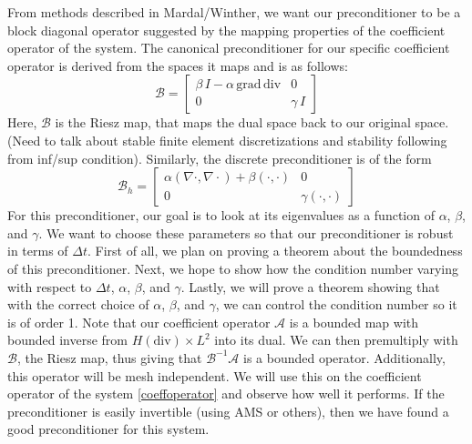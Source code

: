 \documentclass[11pt]{article}
\newcommand{\divv}{\mathrm{div}}
\newcommand{\gradd}{\mathrm{grad}}
\begin{document}

From methods described in Mardal/Winther, we want our preconditioner to be a block diagonal operator suggested by the mapping properties of the coefficient operator of the system. The canonical preconditioner for our specific coefficient operator is derived from the spaces it maps and is as follows:
\begin{equation}
\mathscr{B}=\begin{bmatrix}
 \beta\, I -\alpha\,\gradd\,\divv& 0 \\
0 & \gamma\, I
\end{bmatrix}
\end{equation}
Here, $\mathscr{B}$ is the Riesz map, that maps the dual space back to our original space.
(Need to talk about stable finite element discretizations and stability following from inf/sup condition).
Similarly, the discrete preconditioner is of the form
\begin{equation}
\mathscr{B}_h=\begin{bmatrix}
\alpha(\nabla \cdot, \nabla \cdot) + \beta(\cdot,\cdot) & 0 \\
0 & \gamma(\cdot, \cdot)
\end{bmatrix}
\end{equation} For this preconditioner, our goal is to look at its eigenvalues as a function of $\alpha$, $\beta$, and $\gamma$. We want to choose these parameters so that our preconditioner is robust in terms of $\Delta t$. First of all, we plan on proving a theorem about the boundedness of this preconditioner. Next, we hope to show how the condition number varying with respect to $\Delta t$, $\alpha$, $\beta$, and $\gamma$. Lastly, we will prove a theorem showing that with the correct choice of $\alpha$, $\beta$, and $\gamma$, we can control the condition number so it is of order 1.
Note that our coefficient operator $\mathscr{A}$  is a bounded map with bounded inverse from $H(\divv) \times L^2$ into its dual. We can then premultiply with $\mathscr{B}$, the Riesz map, thus giving  that $\mathscr{B}^{-1}\mathscr{A}$ is a bounded operator. Additionally, this operator will be mesh independent.
 We will use this on the coefficient operator of the system \eqref{coeffoperator} and observe how well it performs. If the preconditioner is easily invertible (using AMS or others), then we have found a good preconditioner for this system.
\end{document}
